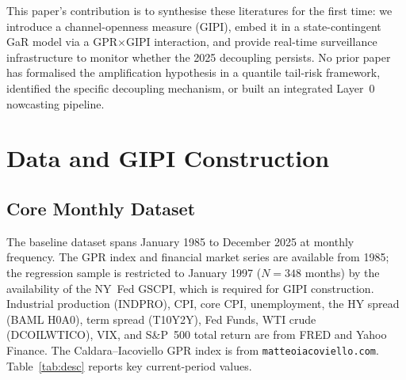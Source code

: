 \documentclass[12pt]{article}
\begin{document}
This paper's contribution is to synthesise these literatures for the first time:
we introduce a channel-openness measure (GIPI), embed it in a state-contingent
GaR model via a GPR$\times$GIPI interaction, and provide real-time surveillance
infrastructure to monitor whether the 2025 decoupling persists.
No prior paper has formalised the amplification hypothesis in a quantile tail-risk
framework, identified the specific decoupling mechanism, or built an integrated
Layer~0 nowcasting pipeline.

\section{Data and GIPI Construction}\label{sec:data}

\subsection{Core Monthly Dataset}

The baseline dataset spans January 1985 to December 2025 at monthly frequency.
The GPR index and financial market series are available from 1985;
the regression sample is restricted to January 1997 ($N = 348$ months)
by the availability of the NY~Fed GSCPI, which is required for GIPI
construction.
Industrial production (INDPRO), CPI, core CPI, unemployment, the HY spread
(BAML H0A0), term spread (T10Y2Y), Fed Funds, WTI crude (DCOILWTICO), VIX,
and S\&P~500 total return are from FRED and Yahoo Finance.
The Caldara--Iacoviello GPR index is from \texttt{matteoiacoviello.com}.
Table~\ref{tab:desc} reports key current-period values.
\end{document}
